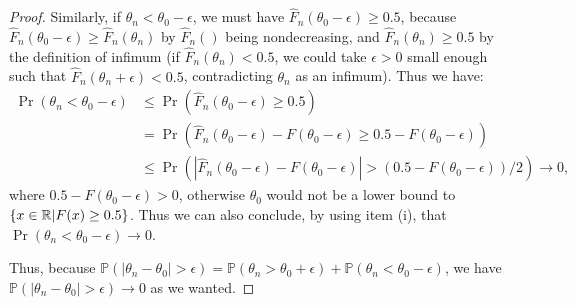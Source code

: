 \documentclass[12pt, letterpaper]{paper}
\begin{document}
\begin{question}
\begin{proof}
Similarly, if $\theta_n<\theta_0-\epsilon$, we must have $\hat{F}_n(\theta_0-\epsilon)\ge 0.5$, because $\hat{F}_n(\theta_0-\epsilon)\ge\hat{F}_n(\theta_n)$ by $\hat{F}_n()$ being nondecreasing, and $\hat{F}_n(\theta_n)\ge 0.5$ by the definition of infimum (if $\hat{F}_n(\theta_n)< 0.5$, we could take $\epsilon>0$ small enough such that $\hat{F}_n(\theta_n+\epsilon)<0.5$, contradicting $\theta_n$ as an infimum). Thus we have:
\begin{equation}
    \begin{split}
        \Pr(\theta_n<\theta_0-\epsilon)&\le \Pr(\hat{F}_n(\theta_0-\epsilon)\ge 0.5)\\
        &=\Pr(\hat{F}_n(\theta_0-\epsilon)-F(\theta_0-\epsilon)\ge 0.5-F(\theta_0-\epsilon))\\
        &\le \Pr(|\hat{F}_n(\theta_0-\epsilon)-F(\theta_0-\epsilon)|> (0.5-F(\theta_0-\epsilon))/2)\to 0,
    \end{split}
\end{equation}
\noindent where $0.5-F(\theta_0-\epsilon)>0$, otherwise $\theta_0$ would not be a lower bound to $\{x\in\mathbb{R}|F(x)\ge 0.5\}$. Thus we can also conclude, by using item (i), that $\Pr(\theta_n<\theta_0-\epsilon)\to 0$.

Thus, because $\mathbb{P}(|\theta_n-\theta_0|>\epsilon)=\mathbb{P}(\theta_n>\theta_0+\epsilon)+\mathbb{P}(\theta_n<\theta_0-\epsilon)$, we have $\mathbb{P}(|\theta_n-\theta_0|>\epsilon)\to 0$ as we wanted.

    \end{proof}
  \end{question}
\end{document}
